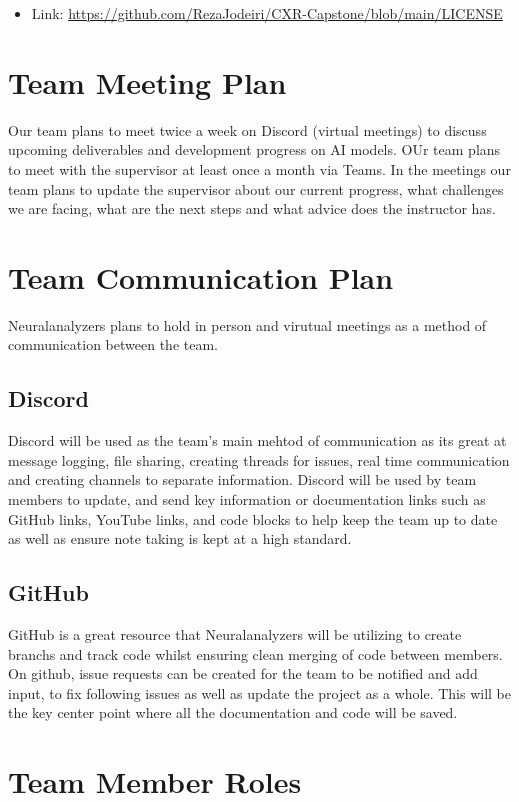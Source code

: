 \documentclass{article}
\begin{document}
\begin{itemize}
    \item Link: \url{https://github.com/RezaJodeiri/CXR-Capstone/blob/main/LICENSE}
\end{itemize}

\section{Team Meeting Plan}

Our team plans to meet twice a week on Discord (virtual meetings) to discuss upcoming deliverables and development progress on AI models. 
OUr team plans to meet with the supervisor at least once a month via Teams. In the meetings our team plans to update the supervisor about our current progress, what challenges we are facing, what are the next steps and what advice does the instructor has. 


\section{Team Communication Plan}

Neuralanalyzers plans to hold in person and virutual meetings as a method of communication between the team. 

\subsection{Discord}
Discord will be used as the team's main mehtod of communication as its great at message logging, file sharing, creating threads for issues, real time communication and creating channels to separate information. Discord will be used by team members to update, and send key information or documentation links such as GitHub links, YouTube links, and code blocks to help keep the team up to date as well as ensure note taking is kept at a high standard. 
\subsection{GitHub}
GitHub is a great resource that Neuralanalyzers will be utilizing to create branchs and track code whilst ensuring clean merging of code between members. On github, issue requests can be created for the team to be notified and add input, to fix following issues as well as update the project as a whole. This will be the key center point where all the documentation and code will be saved. 

\section{Team Member Roles}
\end{document}
